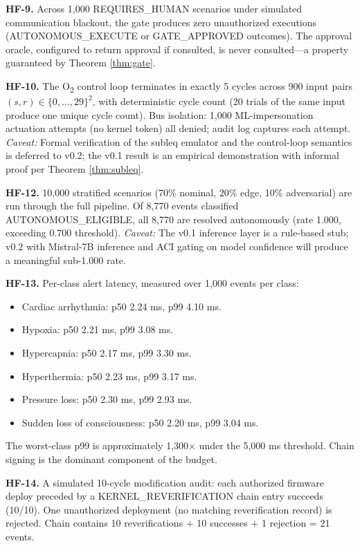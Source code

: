 \documentclass[conference]{IEEEtran}
\theoremstyle{definition}
\theoremstyle{plain}
\theoremstyle{remark}
\begin{document}
\textbf{HF-9.} Across 1{,}000 REQUIRES\_HUMAN scenarios under simulated communication blackout, the gate produces zero unauthorized executions (AUTONOMOUS\_EXECUTE or GATE\_APPROVED outcomes). The approval oracle, configured to return approval if consulted, is never consulted---a property guaranteed by Theorem \ref{thm:gate}.

\textbf{HF-10.} The O\textsubscript{2} control loop terminates in exactly 5 cycles across 900 input pairs $(s, r) \in \{0, \ldots, 29\}^2$, with deterministic cycle count (20 trials of the same input produce one unique cycle count). Bus isolation: 1{,}000 ML-impersonation actuation attempts (no kernel token) all denied; audit log captures each attempt. \emph{Caveat:} Formal verification of the subleq emulator and the control-loop semantics is deferred to v0.2; the v0.1 result is an empirical demonstration with informal proof per Theorem \ref{thm:subleq}.

\textbf{HF-12.} 10{,}000 stratified scenarios (70\% nominal, 20\% edge, 10\% adversarial) are run through the full pipeline. Of 8{,}770 events classified AUTONOMOUS\_ELIGIBLE, all 8{,}770 are resolved autonomously (rate 1.000, exceeding 0.700 threshold). \emph{Caveat:} The v0.1 inference layer is a rule-based stub; v0.2 with Mistral-7B inference and ACI gating on model confidence will produce a meaningful sub-1.000 rate.

\textbf{HF-13.} Per-class alert latency, measured over 1{,}000 events per class:
\begin{itemize}
\item Cardiac arrhythmia: p50 2.24 ms, p99 4.10 ms.
\item Hypoxia: p50 2.21 ms, p99 3.08 ms.
\item Hypercapnia: p50 2.17 ms, p99 3.30 ms.
\item Hyperthermia: p50 2.23 ms, p99 3.17 ms.
\item Pressure loss: p50 2.30 ms, p99 2.93 ms.
\item Sudden loss of consciousness: p50 2.20 ms, p99 3.04 ms.
\end{itemize}
The worst-class p99 is approximately 1{,}300$\times$ under the 5{,}000 ms threshold. Chain signing is the dominant component of the budget.

\textbf{HF-14.} A simulated 10-cycle modification audit: each authorized firmware deploy preceded by a KERNEL\_REVERIFICATION chain entry succeeds (10/10). One unauthorized deployment (no matching reverification record) is rejected. Chain contains 10 reverifications + 10 successes + 1 rejection = 21 events.
\end{document}
